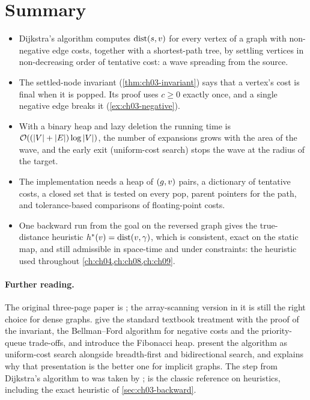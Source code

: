 \section{Summary}
\begin{summary}
\begin{itemize}
  \item Dijkstra's algorithm computes $\operatorname{dist}(s,v)$ for every vertex of a graph with
non-negative edge costs, together with a shortest-path tree, by settling vertices in
non-decreasing order of tentative cost: a wave spreading from the source.
  \item The settled-node invariant (\cref{thm:ch03-invariant}) says that a vertex's cost is
final when it is popped. Its proof uses $c\ge0$ exactly once, and a single negative edge breaks
it (\cref{ex:ch03-negative}).
  \item With a binary heap and lazy deletion the running time is
$\mathcal{O}\!\left((\left\lvert V \right\rvert+\left\lvert E \right\rvert)\log\left\lvert V \right\rvert\right)$, the number of expansions grows with the area of the wave,
and the early exit (uniform-cost search) stops the wave at the radius of the target.
  \item The implementation needs a heap of $(g,v)$ pairs, a dictionary of tentative costs,
a closed set that is tested on every pop, parent pointers for the path, and tolerance-based
comparisons of floating-point costs.
  \item One backward run from the goal on the reversed graph gives the true-distance heuristic
$h^*(v)=\operatorname{dist}(v,\gamma)$, which is consistent, exact on the static map, and still admissible in
space-time and under constraints: the heuristic used throughout \cref{ch:ch04,ch:ch08,ch:ch09}.
\end{itemize}
\end{summary}

\paragraph{Further reading.}
The original three-page paper is \cite{dijkstra1959note}; the array-scanning version in it is
still the right choice for dense graphs. \textcite{cormen2009clrs} give the standard textbook
treatment with the proof of the invariant, the Bellman--Ford algorithm for negative costs and
the priority-queue trade-offs, and \textcite{fredman1987fibonacci} introduce the Fibonacci heap.
\textcite{russell2020aima} present the algorithm as uniform-cost search alongside breadth-first
and bidirectional search, and \textcite{felner2011position} explains why that presentation is
the better one for implicit graphs. The step from Dijkstra's algorithm to \astar was taken by
\textcite{hart1968formal}; \textcite{pearl1984heuristics} is the classic reference on
heuristics, including the exact heuristic of \cref{sec:ch03-backward}.

